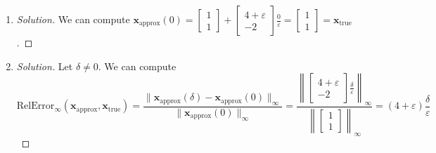 \documentclass{article}
\newcommand{\ep}{{\varepsilon}}
\begin{document}
\begin{enumerate}
\begin{proof}[Solution]
\[			\begin{bmatrix} 4+\ep \\ -2 \end{bmatrix}\frac{\delta}{\ep}
		\]
	\end{proof}
	\item \begin{proof}[Solution]\let\qed\relax
		We can compute $\mathbf{x}_{\text{approx}}(0)
		= \begin{bmatrix} 1 \\ 1 \end{bmatrix} +
		\begin{bmatrix} 4+\ep \\ -2 \end{bmatrix}\frac{0}{\ep}
		= \begin{bmatrix} 1 \\ 1 \end{bmatrix} = \mathbf{x}_{\text{true}}$.
	\end{proof}
	\item \begin{proof}[Solution]\let\qed\relax
		Let $\delta \neq 0$. We can compute
		\[
			\mathrm{RelError}_\infty(\mathbf{x}_{\text{approx}},\mathbf{x}_{\text{true}})
			= \frac{\lVert \mathbf{x}_{\text{approx}}(\delta)
			- \mathbf{x}_{\text{approx}}(0)\rVert_\infty}
			{\lVert \mathbf{x}_{\text{approx}}(0)\rVert_\infty}
			= \frac{\left\lVert
			\begin{bmatrix} 4 + \ep \\ -2 \end{bmatrix}\frac{\delta}{\ep}\right\rVert_\infty}
			{\left\lVert\begin{bmatrix}1 \\ 1 \end{bmatrix}\right\rVert_\infty}
			= (4+\ep)\frac{\delta}{\ep}
		\]


\end{proof}
\end{enumerate}
\end{document}
